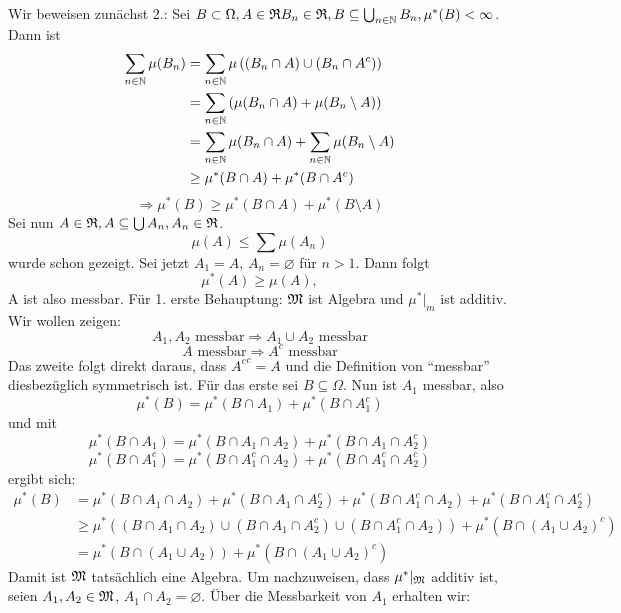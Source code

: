 			\begin{bew}
				Wir beweisen zunächst 2.:\newline
				Sei $B\subset\Omega, A\in\mathfrak{R} B_n\in\mathfrak{R}, B\subseteq \bigcup_{n\in\mathbb{N}} B_n, \mu^*(B)<\infty$. Dann ist
				\begin{align*}
				\sum_{n\in\mathbb{N}}\mu(B_n)&=\sum_{n\in\mathbb{N}}\mu\left((B_n\cap A)\cup(B_n\cap A^c)\right)\\
				&=\sum_{n\in\mathbb{N}} \left(\mu(B_n\cap A)+\mu(B_n\setminus A)\right)\\
				&=\sum_{n\in\mathbb{N}}\mu(B_n\cap A)+\sum_{n\in\mathbb{N}} \mu(B_n\setminus A)\\
				&\ge \mu^*(B\cap A)+\mu^*(B\cap A^c)
				\end{align*}
				\[ \Rightarrow \mu^*(B)\ge \mu^*(B\cap A)+\mu^*(B\setminus A) \]
				\arge
				Sei nun $A\in \mathfrak{R}, A\subseteq \bigcup A_n, A_n\in\mathfrak{R}$. 
				\[ \mu(A)\le \sum \mu(A_n) \]
				wurde schon gezeigt. Sei jetzt $A_1=A$, $A_n=\varnothing$ für $n>1$. Dann folgt 
				\[ \mu^*(A)\ge\mu(A), \]
				A ist also messbar.\newline\newline
				Für 1. erste Behauptung: $\mathfrak{M}$ ist Algebra und $\mu^*|_m$ ist additiv. Wir wollen zeigen:
				\[ A_1,A_2\text{ messbar}\Rightarrow A_1\cup A_2 \text{ messbar} \]
				\[ A \text{ messbar}\Rightarrow A^c \text{ messbar} \]
				Das zweite folgt direkt daraus, dass ${A^c}^c=A$ und die Definition von "`messbar"' diesbezüglich symmetrisch ist. \newline
				Für das erste sei $B\subseteq\Omega$. Nun ist $A_1$ messbar, also
				\[ \mu^*(B)=\mu^*(B\cap A_1)+\mu^*(B\cap A_1^c) \]
				und mit
				\[ \mu^*(B\cap A_1)=\mu^*(B\cap A_1\cap A_2)+\mu^*(B\cap A_1\cap A_2^c) \]
				\[ \mu^*(B\cap A_1^c)=\mu^* (B\cap A_1^c\cap A_2)+\mu^*(B\cap A_1^c\cap A_2^c) \]
				ergibt sich:
				\begin{align*}
				\mu^*(B)&=\mu^*(B\cap A_1\cap A_2)+\mu^*(B\cap A_1\cap A_2^c)+\mu^* (B\cap A_1^c\cap A_2)+\mu^*(B\cap A_1^c\cap A_2^c)\\
				&\ge \mu^*\left((B\cap A_1\cap A_2)\cup(B\cap A_1\cap A_2^c)\cup (B\cap A_1^c\cap A_2)\right)+ \mu^*(B\cap (A_1\cup A_2)^c)\\
				&=\mu^*(B\cap(A_1\cup A_2))+\mu^*(B\cap (A_1\cup A_2)^c)
				\end{align*}
				Damit ist $\mathfrak{M}$ tatsächlich eine Algebra.\newline
				Um nachzuweisen, dass $\mu^*|_{\mathfrak{M}}$ additiv ist, seien $A_1, A_2\in \mathfrak{M}$, $A_1\cap A_2=\varnothing$. Über die Messbarkeit von $A_1$ erhalten wir:

\end{bew}
